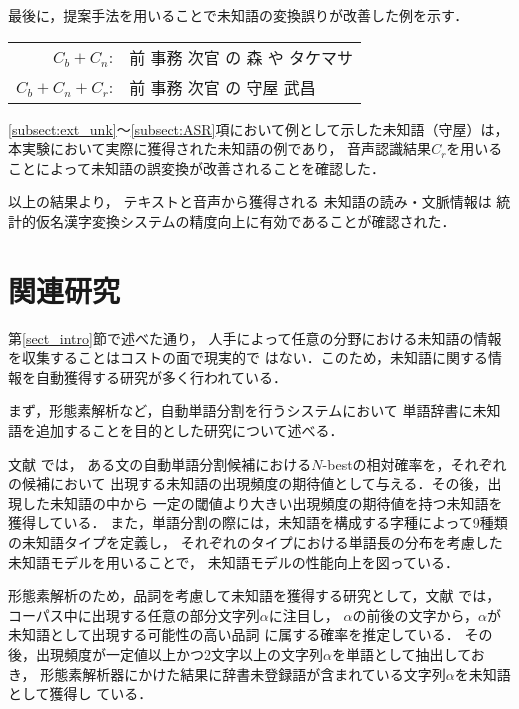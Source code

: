 \documentclass[japanese]{jnlp_1.4}
\begin{document}
最後に，提案手法を用いることで未知語の変換誤りが改善した例を示す．
       \vspace{10pt}
       \begin{center}
	\begin{tabular}{|rl|}\hline
	 $C_b+C_n$: &前 事務 次官 の 森 や タケマサ\\
	 $C_b+C_n+C_r$: &前 事務 次官 の 守屋 武昌\\
	 \hline
	\end{tabular}
       \end{center}
       \vspace{10pt}
\ref{subsect:ext_unk}〜\ref{subsect:ASR}項において例として示した未知語（守屋）は，
本実験において実際に獲得された未知語の例であり，
音声認識結果$C_r$を用いることによって未知語の誤変換が改善されることを確認した．


以上の結果より，
テキストと音声から獲得される
未知語の読み・文脈情報は
統計的仮名漢字変換システムの精度向上に有効であることが確認された．




\section{関連研究}
\label{sect5_rwork}


第\ref{sect_intro}節で述べた通り，
人手によって任意の分野における未知語の情報を収集することはコストの面で現実的で
はない．このため，未知語に関する情報を自動獲得する研究が多く行われている．

まず，形態素解析など，自動単語分割を行うシステムにおいて
単語辞書に未知語を追加することを目的とした研究について述べる．

文献\cite{未知語の確率モデルと単語の出現頻度の期待値に基づくテキストからの語彙獲得}
では，
ある文の自動単語分割候補における$N$-bestの相対確率を，それぞれの候補において
出現する未知語の出現頻度の期待値として与える．その後，出現した未知語の中から
一定の閾値より大きい出現頻度の期待値を持つ未知語を獲得している．
また，単語分割の際には，未知語を構成する字種によって9種類の未知語タイプを定義し，
それぞれのタイプにおける単語長の分布を考慮した未知語モデルを用いることで，
未知語モデルの性能向上を図っている．

形態素解析のため，品詞を考慮して未知語を獲得する研究として，文献
\cite{Word.Extraction.from.Corpora.and.Its.Part-of-Speech.Estimation.Using.Distributional.Analysis}
では，コーパス中に出現する任意の部分文字列$\alpha$に注目し，
$\alpha$の前後の文字から，$\alpha$が未知語として出現する可能性の高い品詞
に属する確率を推定している．
その後，出現頻度が一定値以上かつ2文字以上の文字列$\alpha$を単語として抽出しておき，
形態素解析器にかけた結果に辞書未登録語が含まれている文字列$\alpha$を未知語として獲得し
ている．
\end{document}
